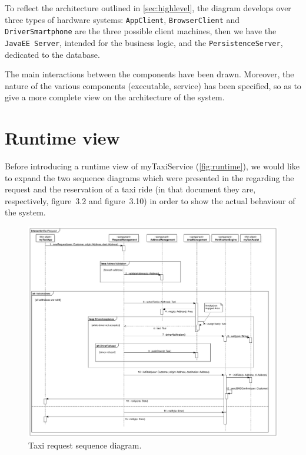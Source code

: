 To reflect the architecture outlined in \cref{sec:highlevel}, the diagram develops over three types of hardware systems: \texttt{App\-Cli\-ent}, \texttt{Brows\-er\-Cli\-ent} and \texttt{Driver\-Smart\-phone} are the three possible client machines, then we have the \texttt{Java\-EE Ser\-ver}, intended for the business logic, and the \texttt{Per\-sist\-ence\-Ser\-ver}, dedicated to the database.

The main interactions between the components have been drawn. Moreover, the nature of the various components (executable, service) has been specified, so as to give a more complete view on the architecture of the system.



\section{Runtime view}\label{sec:runtime}
Before introducing a runtime view of myTaxiService (\cref{fig:runtime}), we would like to expand the two sequence diagrams which were presented in the \rasd regarding the request and the reservation of a taxi ride (in that document they are, respectively, figure~3.2 and figure~3.10) in order to show the actual behaviour of the system.

\begin{figure}%
	\centering%
	\includegraphics[width=\textwidth]{img/Sequence__Collaboration1__Interaction1__TaxiRequest_2}%
	\caption{Taxi request sequence diagram.}\label{fig:reqSequence}%
\end{figure}

